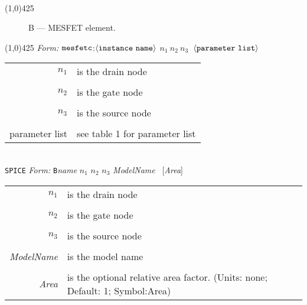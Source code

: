 \documentclass{article}
\begin{document}
\\
\hrulefill\linethickness{0.5mm}\line(1,0){425}
\normalsize
\newline
\begin{figure}[h]
\centerline{\epsfxsize=1.5in} \caption{B --- MESFET
element.}
\end{figure}
\newline
\linethickness{0.5mm}\line(1,0){425}
\newline
\textit{\FDA Form:}
$\tt mesfetc $:$\langle \tt{instance\ name}\rangle$ $n_1\ n_2\
n_3\ $ $\langle \tt{parameter\ list}\rangle$
\newline
\begin{tabular}{r l}
$n_1$ & is the drain node \\
&  \\
$n_2$ & is the gate node \\
&  \\
$n_3$ & is the source node \\
& \\
parameter list & see table 1 for parameter list
\end{tabular}\\
\newline
\texttt{SPICE} \textit{Form:}
\newline
\texttt{B}\textit{name} $n_1$ $n_2$ $n_3$ \textit{ModelName} \
[\textit{Area}]
\newline
\newline
\begin{tabular}{r l}
$n_1$ & is the drain node \\
& \\
$n_2$ & is the gate node \\
&  \\
$n_3$ & is the source node \\
& \\
\textit{ModelName} & is the model name \\
&  \\
\textit{Area} & is the optional relative area factor. (Units: none; Default: 1; Symbol:Area)\\
\end{tabular}
\end{document}
